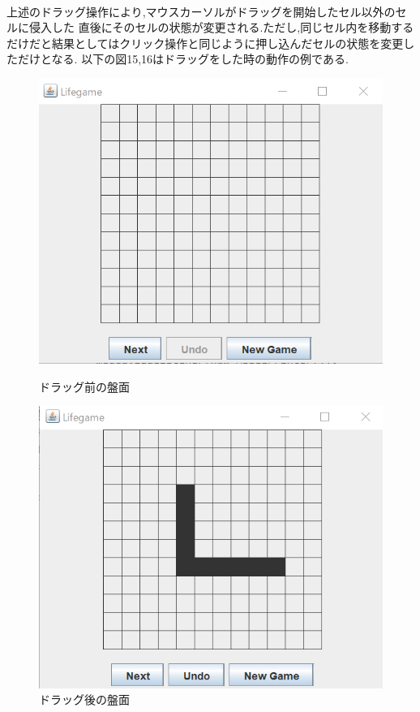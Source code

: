 \documentclass[dvipdfmx]{jarticle}
\begin{document}
  \\上述のドラッグ操作により,マウスカーソルがドラッグを開始したセル以外のセルに侵入した
  直後にそのセルの状態が変更される.ただし,同じセル内を移動するだけだと結果としてはクリック操作と同じように押し込んだセルの状態を変更しただけとなる.
  以下の図15,16はドラッグをした時の動作の例である.
  \begin{figure}[htbp]
    \begin{minipage}[b]{0.45\linewidth}
      \centering
      \includegraphics[keepaspectratio, scale=0.4]{panel_normal.png}
      \caption{ドラッグ前の盤面}
    \end{minipage}
    \begin{minipage}[b]{0.45\linewidth}
      \centering
      \includegraphics[keepaspectratio, scale=0.4]{panel_drag.png}
      \caption{ドラッグ後の盤面}
    \end{minipage}
\end{figure}
\end{document}
